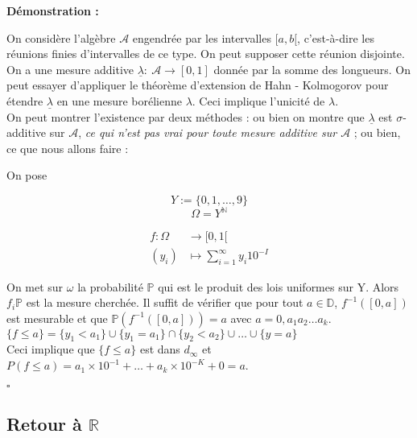 \documentclass[10pt,a4paper,notitlepage ]{report}
\newcommand{\N}{\mathbb N}
\newcommand{\R}{\mathbb R}
\newcounter{th}
\newenvironment{demo}[1][]{

	\textbf{Démonstration #1 :}
}{\begin{flushright}
	$\square$
\end{flushright}
}
\begin{document}
\begin{demo}

On considère l'algèbre $\mathcal{A}$ engendrée par les intervalles $[a,b[$, c'est-à-dire les réunions finies d'intervalles de ce type. On peut supposer cette réunion disjointe. \\

On a une mesure additive $\underline{\lambda} : \ \mathcal{A} \rightarrow [0,1]  $ donnée par la somme des longueurs. On peut essayer d'appliquer le théorème d'extension de Hahn - Kolmogorov pour étendre $\underline{\lambda} $ en une mesure borélienne $\lambda$. Ceci implique l'unicité de $\lambda$. \\

On peut montrer l'existence par deux méthodes : ou bien on montre que $\underline{\lambda} $ est $\sigma$-additive sur $\mathcal{A}$, \emph{ce qui n'est pas vrai pour toute mesure additive sur $\mathcal{A}$} ; ou bien, ce que nous allons faire :

On pose 

$$Y := \lbrace 0,1, \ldots , 9 \rbrace $$
$$\Omega = Y ^{\N} $$


\begin{align*}
f : \Omega &\longrightarrow [0,1[ \\
(y_i) &\longmapsto \sum \limits_{i=1}^\infty y_i 10^{-I} 
\end{align*}


On met sur $\omega$ la probabilité $\mathbb{P}$ qui est le produit des lois uniformes sur Y. Alors $f_i \mathbb{P} $ est la mesure cherchée.
Il suffit de vérifier que pour tout $a \in \mathbb{D} $, $f^{-1} \left( [0,a]  \right) $ est mesurable et que 
$\mathbb{P} \left( f^{-1} \left( [0,a]  \right) \right) = a $ avec $ a = 0, a_1 a_2 \ldots a_k $. \\

$\lbrace f \leq a \rbrace = \lbrace y_1 < a_1 \rbrace \cup \lbrace y_1 = a_1 \rbrace \cap \lbrace y_2 < a_2 \rbrace \cup \dots \cup \lbrace y = a \rbrace $ \\

Ceci implique que $\lbrace f \leq a \rbrace$ est dans $d_{\infty} $ et $P (f \leq a ) = a_1 \times 10^{-1} + \ldots + a_k \times 10 ^ {-K} + 0 = a $.

\end{demo}

\subsection{Retour à $\R$}
\end{document}
